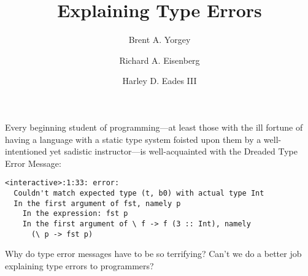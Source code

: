 \documentclass[sigplan, screen]{acmart}\settopmatter{printccs=false,printacmref=false}
\begin{document}
\title{Explaining Type Errors}



\author{Brent A. Yorgey}

\author{Richard A. Eisenberg}

\author{Harley D. Eades III}



\maketitle

Every beginning student of programming---at least those with the ill
fortune of having a language with a static type system foisted upon
them by a well-intentioned yet sadistic instructor---is
well-acquainted with the Dreaded Type Error Message:

\begin{verbatim}
<interactive>:1:33: error:
  Couldn't match expected type (t, b0) with actual type Int
  In the first argument of fst, namely p
    In the expression: fst p
    In the first argument of \ f -> f (3 :: Int), namely
      (\ p -> fst p)
\end{verbatim}

Why do type error messages have to be so terrifying?  Can't we do a
better job explaining type errors to programmers?
\end{document}
